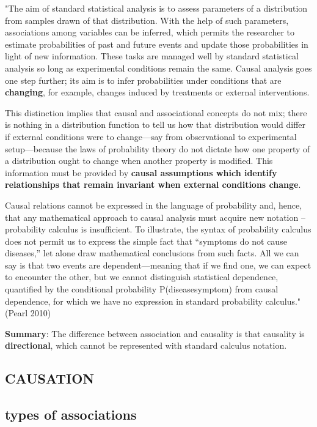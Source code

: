 \documentclass[
]{article}
\begin{document}
"The aim of standard statistical analysis is to assess parameters of a
distribution from samples drawn of that distribution. With the help of
such parameters, associations among variables can be inferred, which
permits the researcher to estimate probabilities of past and future
events and update those probabilities in light of new information. These
tasks are managed well by standard statistical analysis so long as
experimental conditions remain the same. Causal analysis goes one step
further; its aim is to infer probabilities under conditions that are
\textbf{changing}, for example, changes induced by treatments or
external interventions.

This distinction implies that causal and associational concepts do not
mix; there is nothing in a distribution function to tell us how that
distribution would differ if external conditions were to change---say
from observational to experimental setup---because the laws of
probability theory do not dictate how one property of a distribution
ought to change when another property is modified. This information must
be provided by \textbf{causal assumptions which identify relationships
that remain invariant when external conditions change}.

Causal relations cannot be expressed in the language of probability and,
hence, that any mathematical approach to causal analysis must acquire
new notation -- probability calculus is insufficient. To illustrate, the
syntax of probability calculus does not permit us to express the simple
fact that ``symptoms do not cause diseases,'' let alone draw
mathematical conclusions from such facts. All we can say is that two
events are dependent---meaning that if we find one, we can expect to
encounter the other, but we cannot distinguish statistical dependence,
quantified by the conditional probability P(disease\textbar symptom)
from causal dependence, for which we have no expression in standard
probability calculus." (Pearl 2010)

\textbf{Summary}: The difference between association and causality is
that causality is \textbf{directional}, which cannot be represented with
standard calculus notation.

\hypertarget{causation}{%
\subsection{\texorpdfstring{\textbf{CAUSATION}}{CAUSATION}}\label{causation}}

\hypertarget{types-of-associations}{%
\subsection{types of associations}\label{types-of-associations}}
\end{document}
